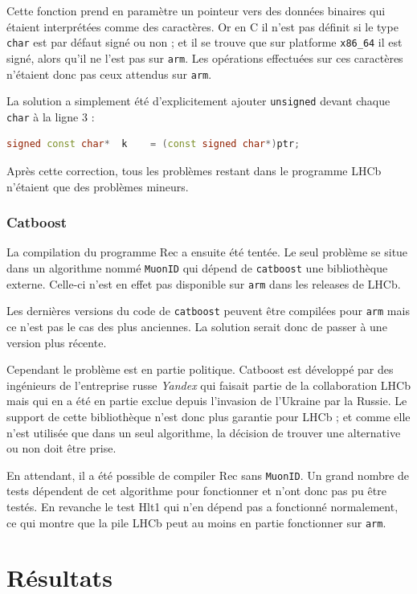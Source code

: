 \documentclass[a4paper,11pt]{report}
\begin{document}
Cette fonction prend en paramètre un pointeur vers des données binaires qui étaient interprétées comme des caractères.
Or en C il n'est pas définit si le type \verb'char' est par défaut signé ou non ; et il se trouve que sur platforme \verb'x86_64' il est signé, alors qu'il ne l'est pas sur \verb'arm'.
Les opérations effectuées sur ces caractères n'étaient donc pas ceux attendus sur \verb'arm'.

La solution a simplement été d'explicitement ajouter \verb'unsigned' devant chaque \verb'char' à la ligne 3 :
\begin{lstlisting}[language=c++]
signed const char*  k    = (const signed char*)ptr;
\end{lstlisting}

Après cette correction, tous les problèmes restant dans le programme LHCb n'étaient que des problèmes mineurs.

\subsection{Catboost}
La compilation du programme Rec a ensuite été tentée.
Le seul problème se situe dans un algorithme nommé \verb'MuonID' qui dépend de \verb'catboost' une bibliothèque externe.
Celle-ci n'est en effet pas disponible sur \verb'arm' dans les releases de LHCb.

Les dernières versions du code de \verb'catboost' peuvent être compilées pour \verb'arm' mais ce n'est pas le cas des plus anciennes.
La solution serait donc de passer à une version plus récente.

Cependant le problème est en partie politique.
Catboost est développé par des ingénieurs de l'entreprise russe \emph{Yandex} qui faisait partie de la collaboration LHCb mais qui en a été en partie exclue depuis l'invasion de l'Ukraine par la Russie.
Le support de cette bibliothèque n'est donc plus garantie pour LHCb ; et comme elle n'est utilisée que dans un seul algorithme, la décision de trouver une alternative ou non doit être prise.

En attendant, il a été possible de compiler Rec sans \verb'MuonID'.
Un grand nombre de tests dépendent de cet algorithme pour fonctionner et n'ont donc pas pu être testés.
En revanche le test Hlt1 qui n'en dépend pas a fonctionné normalement, ce qui montre que la pile LHCb peut au moins en partie fonctionner sur \verb'arm'.


\chapter{Résultats}
\end{document}
